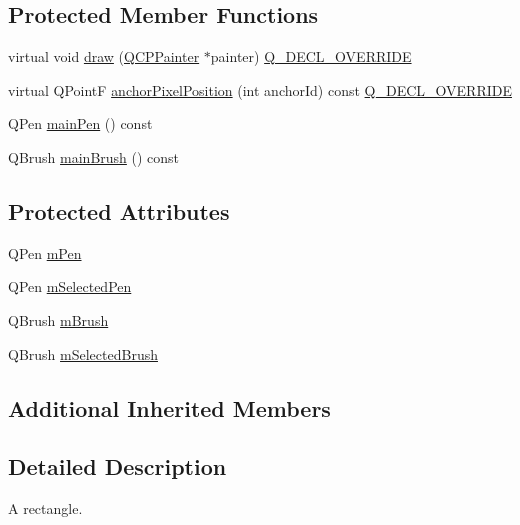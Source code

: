 \subsection*{Protected Member Functions}
\begin{DoxyCompactItemize}
\item 
virtual void \mbox{\hyperlink{class_q_c_p_item_rect_a3c492960d0fc038cf1b60578b62b6cdc}{draw}} (\mbox{\hyperlink{class_q_c_p_painter}{Q\+C\+P\+Painter}} $\ast$painter) \mbox{\hyperlink{qcustomplot_8h_a42cc5eaeb25b85f8b52d2a4b94c56f55}{Q\+\_\+\+D\+E\+C\+L\+\_\+\+O\+V\+E\+R\+R\+I\+DE}}
\item 
virtual Q\+PointF \mbox{\hyperlink{class_q_c_p_item_rect_a844027325b33a3b7eef424128ee5109c}{anchor\+Pixel\+Position}} (int anchor\+Id) const \mbox{\hyperlink{qcustomplot_8h_a42cc5eaeb25b85f8b52d2a4b94c56f55}{Q\+\_\+\+D\+E\+C\+L\+\_\+\+O\+V\+E\+R\+R\+I\+DE}}
\item 
Q\+Pen \mbox{\hyperlink{class_q_c_p_item_rect_af94d87da501e9429c0e874f1c0369b03}{main\+Pen}} () const
\item 
Q\+Brush \mbox{\hyperlink{class_q_c_p_item_rect_a8813d2d670835ac9b8000c981b8ea6fe}{main\+Brush}} () const
\end{DoxyCompactItemize}
\subsection*{Protected Attributes}
\begin{DoxyCompactItemize}
\item 
Q\+Pen \mbox{\hyperlink{class_q_c_p_item_rect_aa0d49323628d6752026056bfb52afd86}{m\+Pen}}
\item 
Q\+Pen \mbox{\hyperlink{class_q_c_p_item_rect_a73cc0bee61de3c67221ec8c7a76a29ed}{m\+Selected\+Pen}}
\item 
Q\+Brush \mbox{\hyperlink{class_q_c_p_item_rect_a2d7f207fada27588b3a52b19234d3c2e}{m\+Brush}}
\item 
Q\+Brush \mbox{\hyperlink{class_q_c_p_item_rect_a21b70eee59b6e19ae0bbdf037b13508f}{m\+Selected\+Brush}}
\end{DoxyCompactItemize}
\subsection*{Additional Inherited Members}


\subsection{Detailed Description}
A rectangle. 

